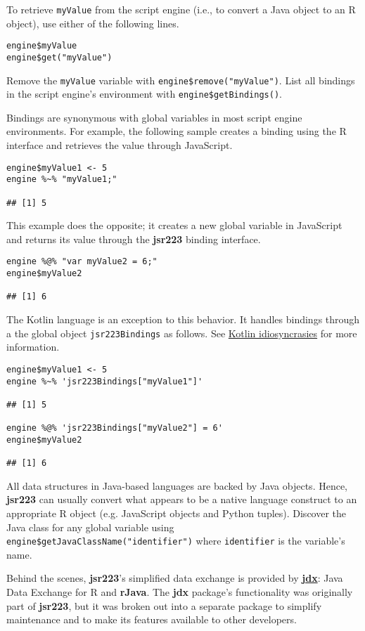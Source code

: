 \documentclass[
article,
11pt, %
a4paper, %
oneside, %
headinclude,footinclude, %
]{scrartcl}
\theoremstyle{definition} %
\theoremstyle{plain} %
\theoremstyle{remark} %
\newcommand{\pkg}[1]{\textbf{#1}}
\newcommand{\CRANpkg}[1]{\href{https://CRAN.R-project.org/package=#1}{\pkg{#1}}}
\newcommand{\code}[1]{\texttt{#1}}
\begin{document}
To retrieve \code{myValue} from the script engine (i.e., to convert a Java object to an R object), use either of the following lines.

\begin{verbatim}
engine$myValue
engine$get("myValue")
\end{verbatim}

Remove the \code{myValue} variable with \code{engine\$remove("myValue")}. List all bindings in the script engine's environment with \code{engine\$getBindings()}.

Bindings are synonymous with global variables in most script engine environments. For example, the following sample creates a binding using the R interface and retrieves the value through JavaScript.

\begin{verbatim}
engine$myValue1 <- 5
engine %~% "myValue1;"

## [1] 5
\end{verbatim}
This example does the opposite; it creates a new global variable in JavaScript and returns its value through the \pkg{jsr223} binding interface.
\begin{verbatim}
engine %@% "var myValue2 = 6;"
engine$myValue2

## [1] 6
\end{verbatim}
The Kotlin language is an exception to this behavior. It handles bindings through a the global object \code{jsr223Bindings} as follows. See \hyperlink{kotlin-idiosyncrasies}{Kotlin idiosyncrasies} for more information.

\begin{verbatim}
engine$myValue1 <- 5
engine %~% 'jsr223Bindings["myValue1"]'

## [1] 5

engine %@% 'jsr223Bindings["myValue2"] = 6'
engine$myValue2

## [1] 6
\end{verbatim}

All data structures in Java-based languages are backed by Java objects. Hence, \pkg{jsr223} can usually convert what appears to be a native language construct to an appropriate R object (e.g. JavaScript objects and Python tuples). Discover the Java class for any global variable using  \code{engine\$getJavaClassName("identifier")} where \code{identifier} is the variable's name.

Behind the scenes, \pkg{jsr223}'s simplified data exchange is provided by \CRANpkg{jdx}: Java Data Exchange for R and \pkg{rJava}. The \pkg{jdx} package's functionality was originally part of \pkg{jsr223}, but it was broken out into a separate package to simplify maintenance and to make its features available to other developers.
\end{document}
